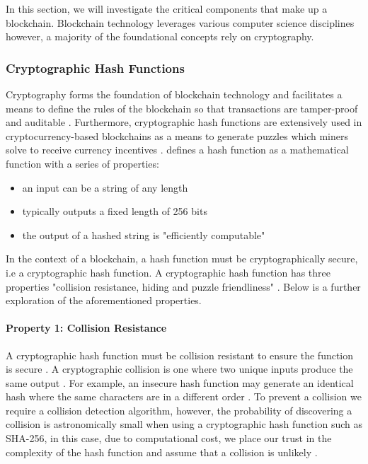 In this section, we will investigate the critical components that make up a blockchain. Blockchain technology leverages various computer science disciplines however, a majority of the foundational concepts rely on cryptography. 

\subsubsection{Cryptographic Hash Functions}

Cryptography forms the foundation of blockchain technology and facilitates a means to define the rules of the blockchain so that transactions are tamper-proof and auditable \autocite{narayananBitcoinCryptocurrencyTechnologies2016} \autocite{imteajIntroductionBlockchainTechnology2021} \autocite{leibleReviewBlockchainTechnology2019}. Furthermore, cryptographic hash functions are extensively used in cryptocurrency-based blockchains as a means to generate puzzles which miners solve to receive currency incentives \autocite{yagaBlockchainTechnologyOverview2018}. \autocite{narayananBitcoinCryptocurrencyTechnologies2016} defines a hash function as a mathematical function with a series of properties:

\begin{itemize}
    \item an input can be a string of any length
    \item typically outputs a fixed length of 256 bits 
    \item the output of a hashed string is "efficiently computable"
\end{itemize}

In the context of a blockchain, a hash function must be cryptographically secure, i.e a cryptographic hash function. A cryptographic hash function has three properties "collision resistance, hiding and puzzle friendliness" \autocite{narayananBitcoinCryptocurrencyTechnologies2016}. Below is a further exploration of the aforementioned properties.

\paragraph{Property 1: Collision Resistance}

A cryptographic hash function must be collision resistant to ensure the function is secure \autocite{dipierroWhatBlockchain2017}. A cryptographic collision is one where two unique inputs produce the same output \autocite{narayananBitcoinCryptocurrencyTechnologies2016} \autocite{yagaBlockchainTechnologyOverview2018}. For example, an insecure hash function may generate an identical hash where the same characters are in a different order \autocite{nakovPracticalCryptographyDevelopers2018}. To prevent a collision we require a collision detection algorithm, however, the probability of discovering a collision is astronomically small when using a cryptographic hash function such as SHA-256, in this case, due to computational cost, we place our trust in the complexity of the hash function and assume that a collision is unlikely \autocite{yagaBlockchainTechnologyOverview2018}.

